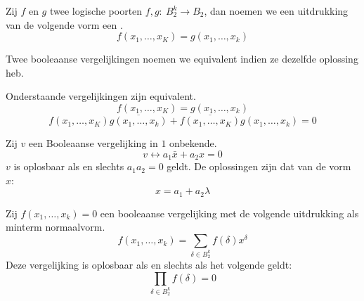 \documentclass[main.tex]{subfiles}
\begin{document}
\begin{de}
  Zij $f$ en $g$ twee logische poorten $f,g:\ B_{2}^{k}\rightarrow B_{2}$, dan noemen we een uitdrukking van de volgende vorm een .
  \[ f(x_{1},\dotsc,x_{K}) = g(x_{1},\dotsc,x_{k}) \]
\end{de}

\begin{de}
  Twee booleaanse vergelijkingen noemen we equivalent indien ze dezelfde oplossing heb.
\end{de}

\begin{st}
  Onderstaande vergelijkingen zijn equivalent.
  \[ f(x_{1},\dotsc,x_{K}) = g(x_{1},\dotsc,x_{k}) \]
  \[ f(x_{1},\dotsc,x_{K})\overline{g(x_{1},\dotsc,x_{k})} + \overline{f(x_{1},\dotsc,x_{K})}g(x_{1},\dotsc,x_{k}) = 0 \]
\end{st}

\begin{st}
  Zij $v$ een Booleaanse vergelijking in $1$ onbekende.
  \[ v \leftrightarrow a_{1}\bar{x} + a_{2}x = 0 \]
  $v$ is oplosbaar als en slechts $a_{1}a_{2} = 0$ geldt.
  De oplossingen zijn dat van de vorm $x$:
  \[ x = a_{1} + a_{2}\lambda \]
\end{st}

\begin{st}
  Zij $f(x_{1},\dotsc,x_{k}) = 0$ een booleaanse vergelijking met de volgende uitdrukking als minterm normaalvorm.
  \[ f(x_{1},\dotsc,x_{k}) = \sum_{\delta \in B_{2}^{k}}f(\delta)x^{\delta} \]
  Deze vergelijking is oplosbaar als en slechts als het volgende geldt:
  \[ \prod_{\delta\in B_{2}^{k}}f(\delta) = 0 \]
\end{st}
\end{document}

